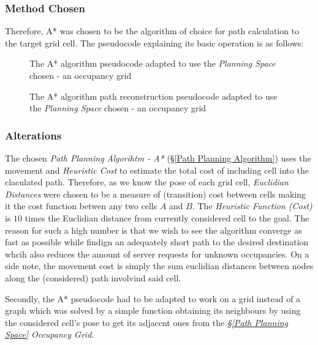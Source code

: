 \documentclass[11pt, a4paper]{article}
\begin{document}
\subsubsection{Method Chosen} 

Therefore, A* was chosen to be the algorithm of choice for path calculation to the target grid cell. The pseudocode explaining its basic operation is as follows:

\begin{figure}[H]
	  \caption{The A* algorithm pseudocode\cite{path_astar_pseudocode} adapted to use the \textit{Planning Space} chosen - an occupancy grid }
\end{figure} 


\begin{figure}[H]
	  \caption{The A* algorithm path reconstruction pseudocode\cite{path_astar_grid_no_grid} adapted to use the \textit{Planning Space} chosen - an occupancy grid }
\end{figure} 

\subsubsection{Alterations}
\label{Path Planning Algorihtm Alterations}

The chosen \textit{Path Planning Algorihtm - A*} (\S\ref{Path Planning Algorithm}) uses the movement and \textit{Heuristic Cost} to estimate the total cost of  including cell into the claculated path. Therefore, as we know the pose of each grid cell, \textit{Euclidian Distances} were chosen to be a measure of (transition) cost between cells making it the cost function betwen any two cells $A$ and $B$. The \textit{Heuristic Function (Cost)} is $10$ times the Euclidian distance from currently considered cell to the goal. The reason for such a high number is that we wish to see the algorithm converge as fast as possible while findign an adequately short path to the desired destination whcih also reduces the amount of server requests for unknown occupancies. On a side note, the movement cost is simply the sum euclidian distances between nodes along the (considered) path involvind said cell.

Secondly, the A* pseudocode had to be adapted to work on a grid instead of a graph which was solved by a simple function obtaining its neighbours by using the considered cell's pose to get its adjacent ones from the \textit{\S\ref{Path Planning Space} Occupancy Grid}.
\end{document}
